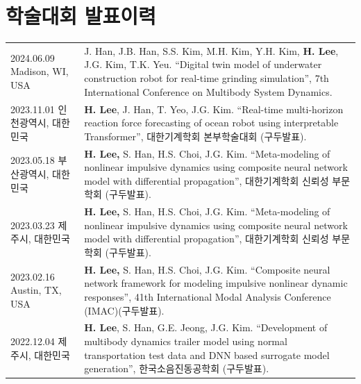 \documentclass[a4paper,10pt]{extarticle}
\begin{document}
\section*{학술대회 발표이력}
\noindent
{}
\vspace*{-.5cm}
\begin{longtable}{LR}
    {2024.06.09 \linebreak Madison, WI, USA} & J. Han, J.B. Han, S.S. Kim, M.H. Kim, Y.H. Kim, \textbf{H. Lee}, J.G. Kim, T.K. Yeu. “Digital twin model of underwater construction robot for real-time grinding simulation”, 7th International Conference on Multibody System Dynamics. \\
    {2023.11.01 \linebreak 인천광역시, 대한민국}      & \textbf{H. Lee}, J. Han, T. Yeo, J.G. Kim. “Real-time multi-horizon reaction force forecasting of ocean robot using interpretable Transformer”,  대한기계학회 본부학술대회 (구두발표).                                                                   \\
    {2023.05.18 \linebreak 부산광역시, 대한민국}      & \textbf{H. Lee,} S. Han, H.S. Choi, J.G. Kim. “Meta-modeling of nonlinear impulsive dynamics using composite neural network model with differential propagation”, 대한기계학회 신뢰성 부문 학회 (구두발표).                                               \\
    {2023.03.23 \linebreak 제주시, 대한민국}        & \textbf{H. Lee,} S. Han, H.S. Choi, J.G. Kim. “Meta-modeling of nonlinear impulsive dynamics using composite neural network model with differential propagation”, 대한기계학회 신뢰성 부문 학회 (구두발표).                                               \\
    {2023.02.16 \linebreak  Austin, TX, USA} & \textbf{H. Lee,} S. Han, H.S. Choi, J.G. Kim. “Composite neural network framework for modeling impulsive nonlinear dynamic responses”, 41th International Modal Analysis Conference (IMAC)(구두발표).                                        \\
    {2022.12.04 \linebreak 제주시, 대한민국}        & \textbf{H. Lee}, S. Han, G.E. Jeong, J.G. Kim. “Development of multibody dynamics trailer model using normal transportation test data and DNN based surrogate model generation”, 한국소음진동공학회 (구두발표).                                       \\
\end{longtable}
\end{document}
